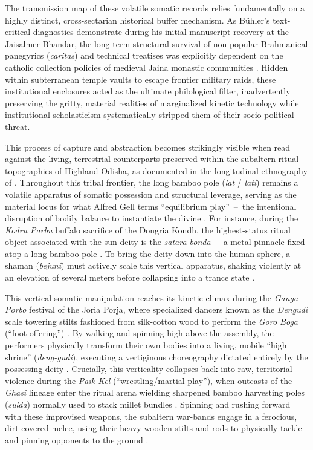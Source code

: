 \documentclass[11pt,twoside,letterpaper]{article}
\newcommand{\gdash}{\, -- \,}
\begin{document}
The transmission map of these volatile somatic records relies fundamentally on a highly distinct, cross-sectarian historical buffer mechanism. As Bühler’s text-critical diagnostics demonstrate during his initial manuscript recovery at the Jaisalmer Bhandar, the long-term structural survival of non-popular Brahmanical panegyrics (\textit{caritas}) and technical treatises was explicitly dependent on the catholic collection policies of medieval Jaina monastic communities \citep{Buhler1875}. Hidden within subterranean temple vaults to escape frontier military raids, these institutional enclosures acted as the ultimate philological filter, inadvertently preserving the gritty, material realities of marginalized kinetic technology while institutional scholasticism systematically stripped them of their socio-political threat. 

This process of capture and abstraction becomes strikingly visible when read against the living, terrestrial counterparts preserved within the subaltern ritual topographies of Highland Odisha, as documented in the longitudinal ethnography of \citet{Berger2015, Berger2023}. Throughout this tribal frontier, the long bamboo pole (\textit{lat} / \textit{lati}) remains a volatile apparatus of somatic possession and structural leverage, serving as the material locus for what Alfred Gell terms ``equilibrium play''\gdash the intentional disruption of bodily balance to instantiate the divine \citep{Gell1980, Berger2023}. For instance, during the \textit{Kodru Parbu} buffalo sacrifice of the Dongria Kondh, the highest-status ritual object associated with the sun deity is the \textit{satara bonda}\gdash a metal pinnacle fixed atop a long bamboo pole \citep{Berger2023}. To bring the deity down into the human sphere, a shaman (\textit{bejuni}) must actively scale this vertical apparatus, shaking violently at an elevation of several meters before collapsing into a trance state \citep{Berger2023}. 

This vertical somatic manipulation reaches its kinetic climax during the \textit{Ganga Porbo} festival of the Joria Porja, where specialized dancers known as the \textit{Dengudi} scale towering stilts fashioned from silk-cotton wood to perform the \textit{Goro Boga} (``foot-offering'') \citep{Berger2015}. By walking and spinning high above the assembly, the performers physically transform their own bodies into a living, mobile ``high shrine'' (\textit{deng-gudi}), executing a vertiginous choreography dictated entirely by the possessing deity \citep{Berger2015}. Crucially, this verticality collapses back into raw, territorial violence during the \textit{Paik Kel} (``wrestling/martial play''), when outcasts of the \textit{Ghasi} lineage enter the ritual arena wielding sharpened bamboo harvesting poles (\textit{sulda}) normally used to stack millet bundles \citep{Berger2015}. Spinning and rushing forward with these improvised weapons, the subaltern war-bands engage in a ferocious, dirt-covered melee, using their heavy wooden stilts and rods to physically tackle and pinning opponents to the ground \citep{Berger2015}. 
\end{document}
